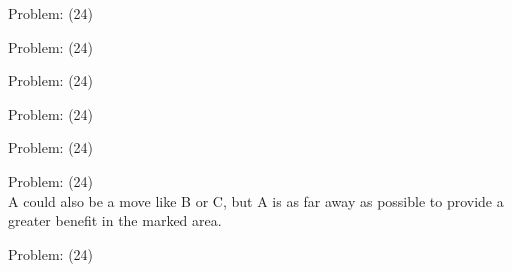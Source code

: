 \documentclass[11pt]{article}
\begin{document}
\begin{minipage}[t]{0.5\textwidth}
  {\centering
  
  Problem: (24)\\
  
  }
\end{minipage}
\begin{minipage}[t]{0.5\textwidth}
  {\centering
  
  Problem: (24)\\
  
  }
\end{minipage}
\begin{minipage}[t]{0.5\textwidth}
  {\centering
  
  Problem: (24)\\
  
  }
\end{minipage}
\begin{minipage}[t]{0.5\textwidth}
  {\centering
  
  Problem: (24)\\
  
  }
\end{minipage}
\begin{minipage}[t]{0.5\textwidth}
  {\centering
  
  Problem: (24)\\
  
  }
\end{minipage}
\begin{minipage}[t]{0.5\textwidth}
  {\centering
  
  Problem: (24)\\
  A could also be a move like B or C, but A is as far away as possible to provide a greater benefit in the marked area.\\
  }
\end{minipage}
\begin{minipage}[t]{0.5\textwidth}
  {\centering
  
  Problem: (24)\\
  
  }
\end{minipage}
\end{document}
